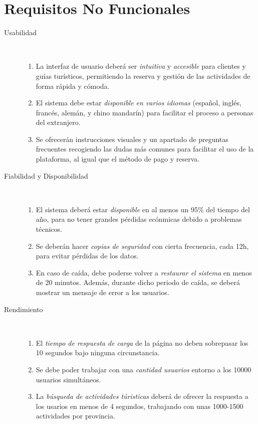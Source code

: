 \section{Requisitos No Funcionales}




\begin{description}
    \item[Usabilidad]~
    \begin{enumerate}[label={\color{red}RNF-\arabic{enumi}.}]
        \item La interfaz de usuario deberá ser \emph{intuitiva} y \emph{accesible} para clientes y guías turísticos, permitiendo la reserva y gestión de las actividades de forma rápida y cómoda.
        \item El sistema debe estar \emph{disponible en varios idiomas} (español, inglés, francés, alemán, y chino mandarín) para facilitar el proceso a personas del extranjero.
        \item Se ofrecerán instrucciones visuales y un apartado de preguntas frecuentes recogiendo las dudas más comunes para facilitar el uso de la plataforma, al igual que el método de pago y reserva.
    \end{enumerate}

    \item[Fiabilidad y Disponibilidad]~
    \begin{enumerate}[label={\color{red}RNF-\arabic{enumi}.}, resume]
        \item El sistema deberá estar \emph{disponible} en al menos un 95\% del tiempo del año, para no tener grandes pérdidas ecónmicas debido a problemas técnicos.
        \item Se deberán hacer \emph{copias de seguridad} con cierta frecuencia, cada 12h, para evitar pérdidas de los datos.
        \item En caso de caída, debe poderse volver a \emph{restaurar el sistema} en menos de 20 minutos.
        Además, durante dicho periodo de caída, se deberá mostrar un mensaje de error a los usuarios.
    \end{enumerate}

    \item[Rendimiento]~
    \begin{enumerate}[label={\color{red}RNF-\arabic{enumi}.}, resume]
        \item El \emph{tiempo de respuesta de carga} de la página no deben sobrepasar los 10 segundos bajo ninguna circunstancia. 
        \item Se debe poder trabajar con una \emph{cantidad usuarios} entorno a los 10000 usuarios simultáneos.
        \item La \emph{búsqueda de actividades túristicas} deberá de ofrecer la respuesta a los usarios en menos de 4 segundos, trabajando con unas 1000-1500 actividades por provincia.
    \end{enumerate}


\end{description}
